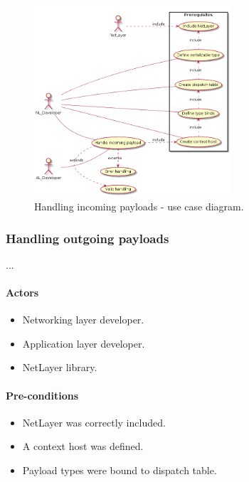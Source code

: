 \documentclass[12pt]{report}
\begin{document}
                    \begin{figure}[H]
                    \caption{Handling incoming payloads - use case diagram.}
                    \centering
                    \includegraphics[width=0.65\textwidth]{d/uc/inc_payloads.png}
                    \end{figure}



                \subsubsection{Handling outgoing payloads}
                    ...
                    \paragraph{Actors}
                        \begin{itemize}
                            \item Networking layer developer.
                            \item Application layer developer.
                            \item NetLayer library.
                        \end{itemize}

                    \paragraph{Pre-conditions}
                        \begin{itemize}
                            \item NetLayer was correctly included.
                            \item A context host was defined.
                            \item Payload types were bound to dispatch table.
                        \end{itemize}
\end{document}
